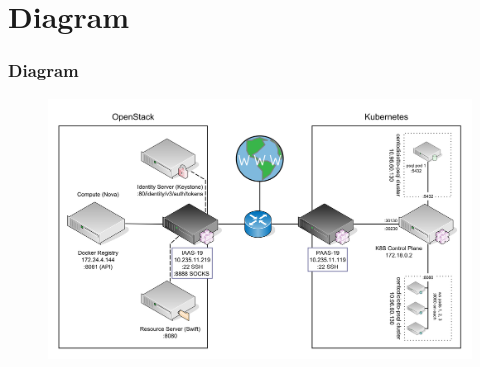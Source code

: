 \documentclass[handout]{beamer}
\title[FCC-21 Group Project]{}
\author[Group 19]{}
\institute[Facchinetti, Franzil]{}
\date[09/06/2021]{9 June 2021}
\begin{document}
\section{Diagram}

\begin{frame}
    \frametitle{Diagram}
    \begin{figure}
    	\centering
    	\includegraphics[height=0.8\textheight]{diagram/diagram.png}
	\end{figure}
\end{frame}
\end{document}
